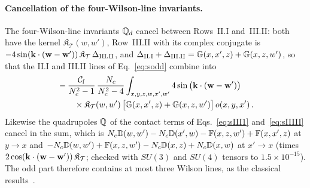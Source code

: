 \paragraph{Cancellation of the four-Wilson-line invariants.} The four-Wilson-line invariants $\mathbb{Q}_d$ cancel between Rows~II.I and~III.II: both have the kernel $\mathfrak K_{\mathcal T}(w,w')$, Row~III.II with its complex conjugate is $-4\sin(\mathbf{k}\cdot(\mathbf{w}-\mathbf{w}'))\,\mathfrak K_{\mathcal T}\,\Delta_{\rm III.II}$, and $\Delta_{\rm II.I}+\Delta_{\rm III.II}=\mathbb{G}(x,x',z)+\mathbb{G}(x,z,w')$, so that the II.I and III.II lines of Eq.~\eqref{eq:sodd} combine into
\begin{align}\label{eq:soddQd}
&-\frac{\mathcal C_{\rm f}}{N_c^2-1}\,\frac{N_c}{N_c^2-4}\int_{x,y,z,w,x',w'}4\sin\big(\mathbf{k}\cdot(\mathbf{w}-\mathbf{w}')\big)\notag\\&\qquad\times\mathfrak K_{\mathcal T}(w,w')\,\big[\mathbb{G}(x,x',z)+\mathbb{G}(x,z,w')\big]\,o(x,y,x')\,.
\end{align}
Likewise the quadrupoles $\mathbb{Q}$ of the contact terms of Eqs.~\eqref{eq:sIII1} and~\eqref{eq:sIIIII} cancel in the sum, which is $N_c\mathbb{D}(w,w')-N_c\mathbb{D}(x',w)-\mathbb{F}(x,z,w')+\mathbb{F}(x,x',z)$ at $y\to x$ and $-N_c\mathbb{D}(w,w')+\mathbb{F}(x,z,w')-N_c\mathbb{D}(x,z)+N_c\mathbb{D}(x,w)$ at $x'\to x$ (times $2\cos(\mathbf{k}\cdot(\mathbf{w}-\mathbf{w}'))\,\mathfrak K_{\mathcal T}$; checked with $SU(3)$ and $SU(4)$ tensors to $1.5\times10^{-15}$). The odd part therefore contains at most three Wilson lines, as the classical results~\cite{McLerran:2016snu,Li:2021ntm}.

